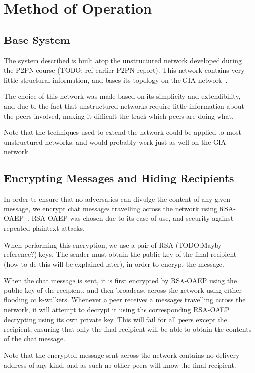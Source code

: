 \section{Method of Operation}

\subsection{Base System}

The system described is built atop the unstructured network developed during the P2PN course (TODO: ref earlier P2PN report). This network contains very little structural information, and bases its topology on the GIA network~\citep{GIA}.

The choice of this network was made based on its simplicity and extendibility, and due to the fact that unstructured networks require little information about the peers involved, making it difficult the track which peers are doing what. 

Note that the techniques used to extend the network could be applied to most unstructured networks, and would probably work just as well on the GIA network.

\subsection{Encrypting Messages and Hiding Recipients}

In order to ensure that no adversaries can divulge the content of any given message, we encrypt chat messages travelling across the network using RSA-OAEP~\citep{OAEP}. RSA-OAEP was chosen due to its ease of use, and security against repeated plaintext attacks.

When performing this encryption, we use a pair of RSA (TODO:Mayby reference?) keys. The sender must obtain the public key of the final recipient (how to do this will be explained later), in order to encrypt the message.

When the chat message is sent, it is first encrypted by RSA-OAEP using the public key of the recipient, and then broadcast across the network using either flooding or k-walkers. Whenever a peer receives a messages travelling across the network, it will attempt to decrypt it using the corresponding RSA-OAEP decrypting using its own private key. This will fail for all peers except the recipient, ensuring that only the final recipient will be able to obtain the contents of the chat message.

Note that the encrypted message sent across the network contains no delivery address of any kind, and as such no other peers will know the final recipient.

